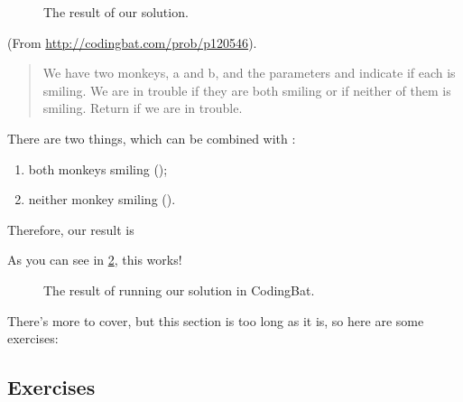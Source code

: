 \begin{figure}[h]
  \centering
  \caption{The result of our  solution.}
  \label{fig:sleep_in}
\end{figure}

\begin{example}
  (From \url{http://codingbat.com/prob/p120546}).

  \begin{quote}
    We have two monkeys, a and b, and the parameters 
    and  indicate if each is smiling. We are in trouble
    if they are both smiling or if neither of them is smiling. Return
     if we are in trouble.
  \end{quote}

  \begin{solution}
    There are two things, which can be combined with :

    \begin{enumerate}
    \item both monkeys smiling ();
    \item neither monkey smiling ().
    \end{enumerate}

    Therefore, our result is


    As you can see in \cref{fig:monkey_trouble}, this works!
  \end{solution}
\end{example}

\begin{figure}[h]
  \centering
  \caption{The result of running our  solution
    in CodingBat.}
  \label{fig:monkey_trouble}
\end{figure}

There's more to cover, but this section is too long as it is, so here
are some exercises:

\subsection{Exercises}

